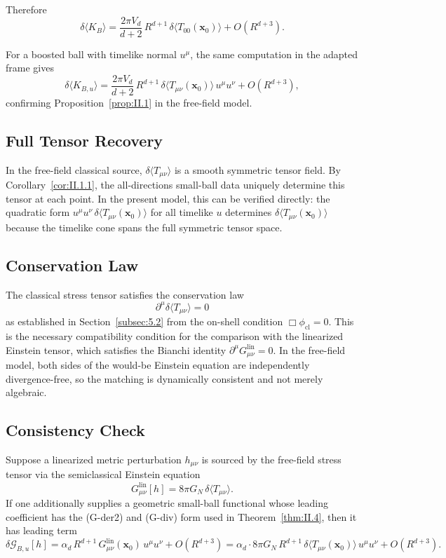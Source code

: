 \documentclass[12pt]{article}
\theoremstyle{definition}
\theoremstyle{remark}
\begin{document}
Therefore
\[
\delta\langle K_B\rangle
=
\frac{2\pi V_d}{d+2}\,R^{d+1}\,\delta\langle T_{00}(\mathbf{x}_0)\rangle
+
O(R^{d+3}).
\]

For a boosted ball with timelike normal \(u^\mu\), the same computation in the adapted frame gives
\[
\delta\langle K_{B,u}\rangle
=
\frac{2\pi V_d}{d+2}\,R^{d+1}\,\delta\langle T_{\mu\nu}(\mathbf{x}_0)\rangle\,u^\mu u^\nu
+
O(R^{d+3}),
\]
confirming Proposition~\ref{prop:II.1} in the free-field model.

\subsection{Full Tensor Recovery}\label{subsec:5.4}

In the free-field classical source, \(\delta\langle T_{\mu\nu}\rangle\) is a smooth symmetric tensor field. By Corollary~\ref{cor:II.1.1}, the all-directions small-ball data uniquely determine this tensor at each point. In the present model, this can be verified directly: the quadratic form \(u^\mu u^\nu\,\delta\langle T_{\mu\nu}(\mathbf{x}_0)\rangle\) for all timelike \(u\) determines \(\delta\langle T_{\mu\nu}(\mathbf{x}_0)\rangle\) because the timelike cone spans the full symmetric tensor space.

\subsection{Conservation Law}\label{subsec:5.5}

The classical stress tensor satisfies the conservation law
\[
\partial^\mu\delta\langle T_{\mu\nu}\rangle = 0
\]
as established in Section~\ref{subsec:5.2} from the on-shell condition \(\Box\phi_{\mathrm{cl}} = 0\). This is the necessary compatibility condition for the comparison with the linearized Einstein tensor, which satisfies the Bianchi identity \(\partial^\mu G^{\mathrm{lin}}_{\mu\nu} = 0\). In the free-field model, both sides of the would-be Einstein equation are independently divergence-free, so the matching is dynamically consistent and not merely algebraic.

\subsection{Consistency Check}\label{subsec:5.6}

Suppose a linearized metric perturbation \(h_{\mu\nu}\) is sourced by the free-field stress tensor via the semiclassical Einstein equation
\[
G^{\mathrm{lin}}_{\mu\nu}[h] = 8\pi G_N\,\delta\langle T_{\mu\nu}\rangle.
\]
If one additionally supplies a geometric small-ball functional whose
leading coefficient has the (G-der2) and (G-div) form used in
Theorem~\ref{thm:II.4}, then it has leading term
\[
\delta\mathcal{G}_{B,u}[h]
=
\alpha_d\,R^{d+1}\,G^{\mathrm{lin}}_{\mu\nu}(\mathbf{x}_0)\,u^\mu u^\nu
+
O(R^{d+3})
=
\alpha_d\cdot 8\pi G_N\,R^{d+1}\,\delta\langle T_{\mu\nu}(\mathbf{x}_0)\rangle\,u^\mu u^\nu
+
O(R^{d+3}).
\]
\end{document}
